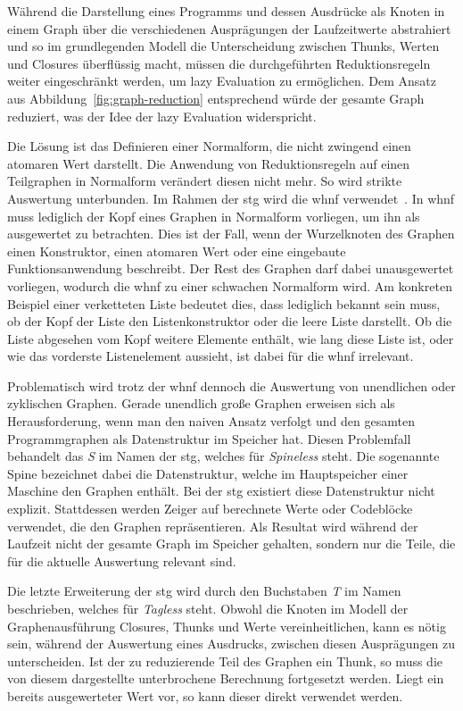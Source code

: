 Während die Darstellung eines Programms und dessen Ausdrücke als Knoten in einem Graph über die verschiedenen Ausprägungen der Laufzeitwerte abstrahiert und so im grundlegenden Modell die Unterscheidung zwischen Thunks, Werten und Closures überflüssig macht, müssen die durchgeführten Reduktionsregeln weiter eingeschränkt werden, um lazy Evaluation zu ermöglichen.
Dem Ansatz aus Abbildung~\ref{fig:graph-reduction} entsprechend würde der gesamte Graph reduziert, was der Idee der lazy Evaluation widerspricht.

Die Lösung ist das Definieren einer Normalform, die nicht zwingend einen atomaren Wert darstellt.
Die Anwendung von Reduktionsregeln auf einen Teilgraphen in Normalform verändert diesen nicht mehr.
So wird strikte Auswertung unterbunden.
Im Rahmen der \gls{stg} wird die \gls{whnf} verwendet~\cite{Wiki_Haskell}.
In \gls{whnf} muss lediglich der Kopf eines Graphen in Normalform vorliegen, um ihn als ausgewertet zu betrachten.
Dies ist der Fall, wenn der Wurzelknoten des Graphen einen Konstruktor, einen atomaren Wert oder eine eingebaute Funktionsanwendung beschreibt.
Der Rest des Graphen darf dabei unausgewertet vorliegen, wodurch die \gls{whnf} zu einer schwachen Normalform wird.
Am konkreten Beispiel einer verketteten Liste bedeutet dies, dass lediglich bekannt sein muss, ob der Kopf der Liste den Listenkonstruktor oder die leere Liste darstellt.
Ob die Liste abgesehen vom Kopf weitere Elemente enthält, wie lang diese Liste ist, oder wie das vorderste Listenelement aussieht, ist dabei für die \gls{whnf} irrelevant.

Problematisch wird trotz der \gls{whnf} dennoch die Auswertung von unendlichen oder zyklischen Graphen.
Gerade unendlich große Graphen erweisen sich als Herausforderung, wenn man den naiven Ansatz verfolgt und den gesamten Programmgraphen als Datenstruktur im Speicher hat.
Diesen Problemfall behandelt das \textit{S} im Namen der \gls{stg}, welches für \textit{Spineless} steht.
Die sogenannte Spine bezeichnet dabei die Datenstruktur, welche im Hauptspeicher einer Maschine den Graphen enthält.
Bei der \gls{stg} existiert diese Datenstruktur nicht explizit.
Stattdessen werden Zeiger auf berechnete Werte oder Codeblöcke verwendet, die den Graphen repräsentieren.
Als Resultat wird während der Laufzeit nicht der gesamte Graph im Speicher gehalten, sondern nur die Teile, die für die aktuelle Auswertung relevant sind.

Die letzte Erweiterung der \gls{stg} wird durch den Buchstaben \textit{T} im Namen beschrieben, welches für \textit{Tagless} steht.
Obwohl die Knoten im Modell der Graphenausführung Closures, Thunks und Werte vereinheitlichen, kann es nötig sein, während der Auswertung eines Ausdrucks, zwischen diesen Ausprägungen zu unterscheiden.
Ist der zu reduzierende Teil des Graphen ein Thunk, so muss die von diesem dargestellte unterbrochene Berechnung fortgesetzt werden.
Liegt ein bereits ausgewerteter Wert vor, so kann dieser direkt verwendet werden.

